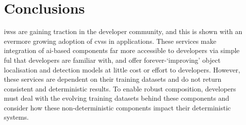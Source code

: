 



\section{Conclusions}
\label{fse2020:sec:conclusions}

\Glspl{iws} are gaining traction in the developer community, and this is shown with an evermore growing adoption of \glspl{cvs} in applications. These services make integration of \gls{ai}-based components far more accessible to developers via simple ful  that developers are familiar with, and offer forever-`improving' object localisation and detection models at little cost or effort to developers. However, these services are dependent on their training datasets and do not return consistent and deterministic results. To enable robust composition, developers must deal with the evolving training datasets behind these components and consider how these non-deterministic components impact their deterministic systems.

